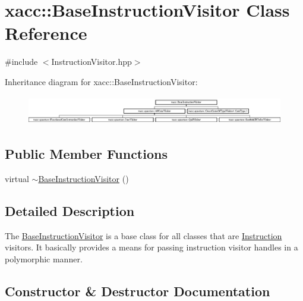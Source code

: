 \hypertarget{a01163}{}\section{xacc\+:\+:Base\+Instruction\+Visitor Class Reference}
\label{a01163}


{\ttfamily \#include $<$Instruction\+Visitor.\+hpp$>$}

Inheritance diagram for xacc\+:\+:Base\+Instruction\+Visitor\+:\begin{figure}[H]
\begin{center}
\leavevmode
\includegraphics[height=1.288344cm]{a01163}
\end{center}
\end{figure}
\subsection*{Public Member Functions}
\begin{DoxyCompactItemize}
\item 
virtual \hyperlink{a01163_aa6f5104f5868fe1eca9be4dc4036eba4}{$\sim$\+Base\+Instruction\+Visitor} ()
\end{DoxyCompactItemize}


\subsection{Detailed Description}
The \hyperlink{a01163}{Base\+Instruction\+Visitor} is a base class for all classes that are \hyperlink{a01155}{Instruction} visitors. It basically provides a means for passing instruction visitor handles in a polymorphic manner. 

\subsection{Constructor \& Destructor Documentation}
\mbox{\label{a01163_aa6f5104f5868fe1eca9be4dc4036eba4}} 
